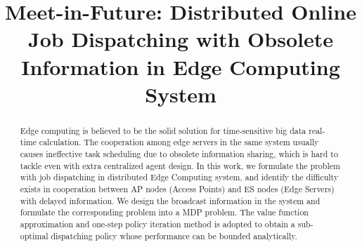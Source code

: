 \documentclass[10pt, conference, letterpaper]{IEEEtran}
\begin{document}
    \title{
        Meet-in-Future: Distributed Online Job Dispatching with Obsolete Information in Edge Computing System
    }
    \author{
    }
    \maketitle

    \begin{abstract}
        \label{sec:abstract}
        Edge computing is believed to be the solid solution for time-sensitive big data real-time calculation. The cooperation among edge servers in the same system usually causes ineffective task scheduling due to obsolete information sharing, which is hard to tackle even with extra centralized agent design. In this work, we formulate the problem with job dispatching in distributed Edge Computing system, and identify the difficulty exists in cooperation between AP nodes (Access Points) and ES nodes (Edge Servers) with delayed information. We design the broadcast information in the system and formulate the corresponding problem into a MDP problem. The value function approximation and one-step policy iteration method is adopted to obtain a sub-optimal dispatching policy whose performance can be bounded analytically.
    \end{abstract}

\end{document}
